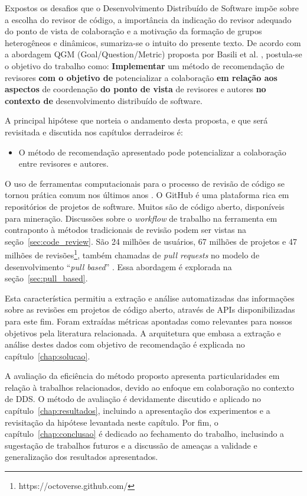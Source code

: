 \documentclass[preprint,review, 12pt]{elsarticle}
\begin{document}
  Expostos os desafios que o Desenvolvimento Distribuído de Software impõe sobre a escolha do revisor de código, a importância da indicação do revisor adequado do ponto de vista de colaboração e a motivação da formação de grupos heterogêneos e dinâmicos, sumariza-se o intuito do presente texto. De acordo com a abordagem QGM (Goal/Question/Metric) proposta por Basili et al. \cite{Basili1984}, postula-se o objetivo do trabalho como:  \textbf{Implementar} um método de recomendação de revisores \textbf{com o objetivo de} potencializar a colaboração \textbf{em relação aos aspectos} de coordenação \textbf{do ponto de vista} de revisores e autores \textbf{no contexto de} desenvolvimento distribuído de software.

  A principal hipótese que norteia o andamento desta proposta, e que será revisitada e discutida nos capítulos derradeiros é:

  \begin{itemize}
    \item O método de recomendação apresentado pode potencializar a colaboração entre revisores e autores.
  \end{itemize}

  O uso de ferramentas computacionais para o processo de revisão de código se tornou prática comum nos últimos anos \cite{Bacchelli2013}. O GitHub é uma plataforma rica em repositórios de projetos de software. Muitos são de código aberto, disponíveis para mineração. Discussões sobre o \textit{workflow} de trabalho na ferramenta em contraponto à métodos tradicionais de revisão podem ser vistas na seção~\ref{sec:code_review}. São 24 milhões de usuários, 67 milhões de projetos e 47 milhões de revisões\footnote{https://octoverse.github.com/}, também chamadas de \textit{pull requests} no modelo de desenvolvimento ``\textit{pull based}'' \cite{gousios2014}. Essa abordagem é explorada na seção~\ref{sec:pull_based}.

  Esta característica permitiu a extração e análise automatizadas das informações sobre as revisões em projetos de código aberto, através de APIs disponibilizadas para este fim. Foram extraídas métricas apontadas como relevantes para nossos objetivos pela literatura relacionada. A arquitetura que embasa a extração e análise destes dados com objetivo de recomendação é explicada no capítulo~\ref{chap:solucao}.

  A avaliação da eficiência do método proposto apresenta particularidades em relação à trabalhos relacionados, devido ao enfoque em colaboração no contexto de DDS. O método de avaliação é devidamente discutido e aplicado no capítulo~\ref{chap:resultados}, incluindo a apresentação dos experimentos e a revisitação da hipótese levantada neste capítulo. Por fim, o capítulo~\ref{chap:conclusao} é dedicado ao fechamento do trabalho, inclusindo a sugestação de trabalhos futuros e a discussão de ameaças a validade e generalização dos resultados apresentados.
\end{document}

